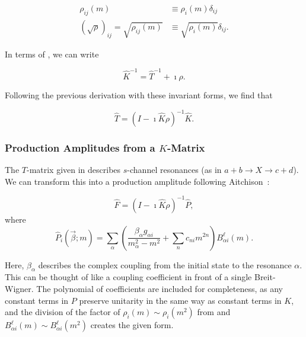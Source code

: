 \begin{align}
  \rho_{ij}(m) &\equiv \rho_i(m)\delta_{ij}\\
  (\sqrt{\rho})_{ij} = \sqrt{\rho_{ij}(m)} &\equiv \sqrt{\rho_i(m)}\delta_{ij}.
\end{align}

In terms of , we can write

\begin{equation}
  \hat{K}^{-1} = \hat{T}^{-1} + \imath \rho.
\end{equation}

Following the previous derivation with these invariant forms, we find that

\begin{equation}
  \hat{T} = (I - \imath\hat{K}\rho)^{-1}\hat{K}.
  \label{eq:t-matrix-from-k-matrix-invariant}
\end{equation}


\subsubsection{Production Amplitudes from a $K$-Matrix}

The $T$-matrix given in  describes $s$-channel resonances (as in $a + b \to X \to c + d$). We can transform this into a production amplitude following Aitchison~\cite{Aitchison1972}:

\begin{equation}
  \hat{F} = (I - \imath\hat{K}\rho)^{-1}\hat{P},
  \label{eq:k-matrix-production-amplitude}
\end{equation}
where
\begin{equation}
  \hat{P}_i(\vec{\beta}; m) = \sum_\alpha \left(\frac{\beta_\alpha g_{\alpha i}}{m_\alpha^2 - m^2} + \sum_n c_{ni} m^{2n} \right)B_{\alpha i}^{\ell}(m).
  \label{eq:p-vector}
\end{equation}

Here, $\beta_\alpha$ describes the complex coupling from the initial state to the resonance $\alpha$. This can be thought of like a coupling coefficient in front of a single Breit-Wigner. The polynomial of coefficients are included for completeness, as any constant terms in $P$ preserve unitarity in the same way as constant terms in $K$, and the division of the factor of $\rho_i(m) \sim \rho_i(m^2)$ from  and $B^\ell_{\alpha i}(m) \sim B^\ell_{\alpha i}(m^2)$ creates the given form.

